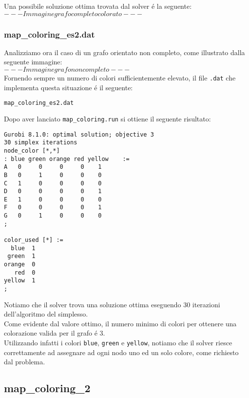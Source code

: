 \documentclass{article}
\begin{document}
Una possibile soluzione ottima trovata dal solver \'e la seguente:\\

$ --- Immagine grafo completo colorato --- $\\





\subsubsection{map\_coloring\_es2.dat}
Analizziamo ora il caso di un grafo orientato non completo, come illustrato dalla seguente immagine:\\

$ --- Immagine grafo non completo --- $\\

Fornendo sempre un numero di colori sufficientemente elevato, il file \texttt{.dat} che implementa questa situazione \'e il seguente:

\texttt{map\_coloring\_es2.dat}


Dopo aver lanciato \texttt{map\_coloring.run} si ottiene il seguente risultato:\\
\begin{verbatim}
Gurobi 8.1.0: optimal solution; objective 3
30 simplex iterations
node_color [*,*]
: blue green orange red yellow    :=
A   0     0     0     0    1
B   0     1     0     0    0
C   1     0     0     0    0
D   0     0     0     0    1
E   1     0     0     0    0
F   0     0     0     0    1
G   0     1     0     0    0
;

color_used [*] :=
  blue  1
 green  1
orange  0
   red  0
yellow  1
;
\end{verbatim}

Notiamo che il solver trova una soluzione ottima eseguendo 30 iterazioni dell'algoritmo del simplesso.\\
Come evidente dal valore ottimo, il numero minimo di colori per ottenere una colorazione valida per il grafo \'e 3.\\
Utilizzando infatti i colori \texttt{blue}, \texttt{green} e \texttt{yellow}, notiamo che il solver riesce correttamente ad assegnare ad ogni nodo uno ed un solo colore, come richiesto dal problema.\\

\subsection{map\_coloring\_2}
\end{document}
